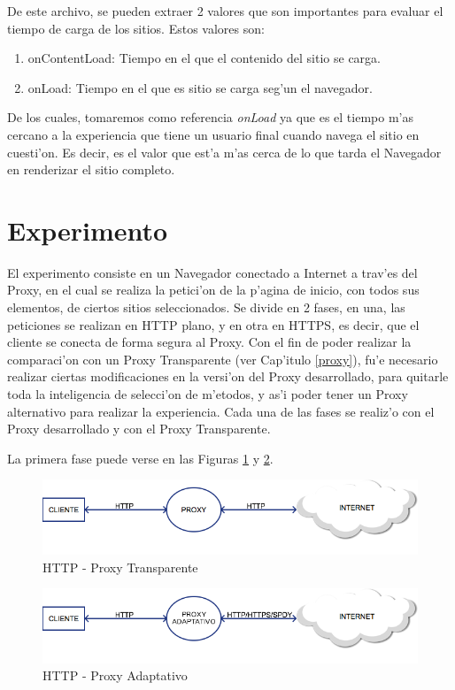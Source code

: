 De este archivo, se pueden extraer 2 valores que son importantes para evaluar el tiempo de carga de los sitios. Estos valores son:
\begin{enumerate}
\item onContentLoad: Tiempo en el que el contenido del sitio se carga.
\item onLoad: Tiempo en el que es sitio se carga seg'un el navegador.
\end{enumerate}

De los cuales, tomaremos como referencia \emph{onLoad} ya que es el tiempo m'as cercano a la experiencia que tiene un usuario final cuando navega el sitio en cuesti'on. Es decir, es el valor que est'a m'as cerca de lo que tarda el Navegador en renderizar el sitio completo.

\section{Experimento}

El experimento consiste en un Navegador conectado a Internet a trav'es del Proxy, en el cual se realiza la petici'on de la p'agina de inicio, con todos sus elementos, de ciertos sitios seleccionados. Se divide en 2 fases, en una, las peticiones se realizan en HTTP plano, y en otra en HTTPS, es decir, que el cliente se conecta de forma segura al Proxy. Con el fin de poder realizar la comparaci'on con un Proxy Transparente (ver Cap'itulo \ref{proxy}), fu'e necesario realizar ciertas modificaciones en la versi'on del Proxy desarrollado, para quitarle toda la inteligencia de selecci'on de m'etodos, y as'i poder tener un Proxy alternativo para realizar la experiencia. Cada una de las fases se realiz'o con el Proxy desarrollado y con el Proxy Transparente.

La primera fase puede verse en las Figuras \ref{httpNormal} y \ref{httpOptimizado}.

\begin{figure}[h]
  	\centering
	\includegraphics[width=\textwidth]{img/httpNormal}
	\caption{\small HTTP - Proxy Transparente}
	\label{httpNormal}
\end{figure}

\begin{figure}[h]
  	\centering
	\includegraphics[width=\textwidth]{img/httpOptimizado}
	\caption{\small HTTP - Proxy Adaptativo}
	\label{httpOptimizado}
\end{figure}

